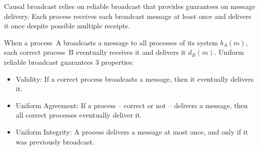 Causal broadcast relies on reliable broadcast that provides guarantees on
message delivery. Each process receives each broadcast message at least once and
delivers it once despite possible multiple receipts.

\begin{definition} 
  When a process~A broadcasts a message to all processes of its system $b_A(m)$,
  each correct process~B eventually receives it and delivers it
  $d_B(m)$. Uniform reliable broadcast guarantees 3 properties:
  \begin{itemize}[leftmargin=*]
  \item Validity: If a correct process broadcasts a message, then it
    eventually delivers it.
  \item Uniform Agreement: If a process -- correct or not -- delivers a message,
    then all correct processes eventually deliver it.
  \item Uniform Integrity: A process delivers a message at most once, and only if
    it was previously broadcast.
  \end{itemize}
\end{definition}





